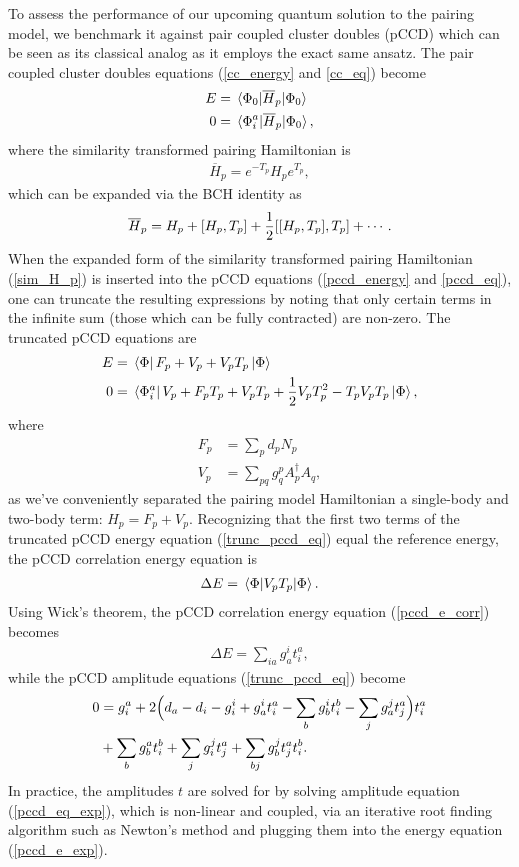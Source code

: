 \documentclass[10pt]{article}
\begin{document}
To assess the performance of our upcoming quantum solution to the pairing model, we benchmark it against pair coupled cluster doubles (pCCD) which can be seen as its classical analog as it employs the exact same ansatz. The pair coupled cluster doubles equations (\ref{cc_energy} and \ref{cc_eq}) become
\begin{align}
\label{pccd_energy} 
E&=\mel{\Phi_0}{\overline{H}_p}{\Phi_0}
\\
\label{pccd_eq}
0&=\mel*{\Phi_i^a}{\overline{H}_p}{\Phi_0}
,\end{align}
where the similarity transformed pairing Hamiltonian is
\begin{align}
\overline{H}_p=e^{-T_p}H_pe^{T_p}
,\end{align}
which can be expanded via the BCH identity as
\begin{align}
\label{sim_H_p}
\overline{H}_p=H_p+\comm{H_p}{T_p}+\frac{1}{2}\comm{\comm{H_p}{T_p}}{T_p}+\cdots
.\end{align}
When the expanded form of the similarity transformed pairing Hamiltonian (\ref{sim_H_p}) is inserted into the pCCD equations (\ref{pccd_energy} and \ref{pccd_eq}), one can truncate the resulting expressions by noting that only certain terms in the infinite sum (those which can be fully contracted) are non-zero. The truncated pCCD equations are
\begin{align}
\label{trunc_pccd_e}
E
&=
\bra*{\Phi}F_p+V_p+V_pT_p\ket{\Phi}
\\
\label{trunc_pccd_eq}
0
&=
\bra*{\Phi_i^a}V_p+F_pT_p+V_pT_p+\frac{1}{2}V_pT_p^2-T_pV_pT_p\ket{\Phi}
,\end{align}
where
\begin{align}
F_p
&=
\sum_pd_pN_p
\\
V_p
&=
\sum_{pq}g^p_qA^\dagger_pA_q
,\end{align}
as we've conveniently separated the pairing model Hamiltonian a single-body and two-body term: $H_p=F_p+V_p$. Recognizing that the first two terms of the truncated pCCD energy equation (\ref{trunc_pccd_eq}) equal the reference energy, the pCCD correlation energy equation is
\begin{align}
\label{pccd_e_corr}
\Delta E = \mel{\Phi}{V_pT_p}{\Phi}
.\end{align}
Using Wick's theorem, the pCCD correlation energy equation (\ref{pccd_e_corr}) becomes
\begin{align}
\label{pccd_e_exp}
\Delta E=\sum_{ia}g_a^it_i^a
,\end{align}
while the pCCD amplitude equations (\ref{trunc_pccd_eq}) become
\begin{align}
\label{pccd_eq_exp}
0
&=
g^a_i+2\Big{(}d_a-d_i-g^i_i+g^i_at^a_i-\sum_bg^i_bt^b_i-\sum_jg^j_at^a_j\Big{)}t^a_i
\nonumber
\\
&+
\sum_bg^a_bt^b_i+\sum_jg^j_it^a_j+\sum_{bj}g^j_bt^a_jt^b_i
.\end{align}
In practice, the amplitudes $t$ are solved for by solving amplitude equation (\ref{pccd_eq_exp}), which is non-linear and coupled, via an iterative root finding algorithm such as Newton's method and plugging them into the energy equation (\ref{pccd_e_exp}).
\end{document}
